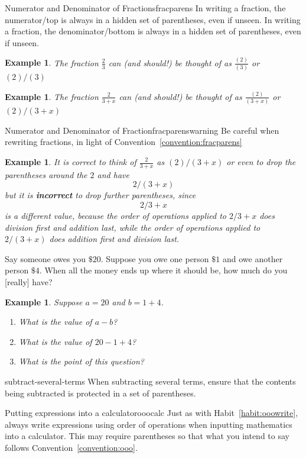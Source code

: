 \documentclass[twoside]{tufte-handout}
\date{\vspace{-0.5em}}
\newcounter{ekcounter}%
\theoremstyle{ekimcustom}
\newtheorem{exm}[ekcounter]{Example}
\begin{document}
\begin{bconvention}{Numerator and Denominator of Fractions}{fracparens}
In writing a fraction, the numerator/top is always in a hidden set of parentheses, even if unseen.
In writing a fraction, the denominator/bottom is always in a hidden set of parentheses, even if unseen.
\end{bconvention}
\begin{exm}
The fraction $\frac23$ can (and should!) be thought of as $\frac{(2)}{(3)}$ or $(2)/(3)$
\end{exm}
\begin{exm}
The fraction $\frac{2}{3+x}$ can (and should!) be thought of as $\frac{(2)}{(3+x)}$ or $(2)/(3+x)$
\end{exm}
\begin{bwarning}{Numerator and Denominator of Fraction}{fracparenswarning}
Be careful when rewriting fractions, in light of Convention~\ref{convention:fracparens}
\end{bwarning}
\begin{exm}
It is correct to think of $\frac{2}{3+x}$ as $(2)/(3+x)$ or even to drop the parentheses around the $2$ and have
\[ 2/(3+x)\]
but it is {\bf incorrect} to drop further parentheses, since
\[ 2/3+x \]
is a different value, because the order of operations applied to $2/3+x$ does division first and addition last, while the order of operations applied to $2/(3+x)$ does addition first and division last.
\end{exm}


Say someone owes you $\$20$. Suppose you owe one person $\$1$ and owe another person $\$4$. When all the money ends up where it should be, how much do you [really] have?
\begin{exm}
Suppose $a=20$ and $b=1+4$.
\begin{enumerate}
\item What is the value of $a-b$?
\vskip20pt
\item What is the value of $20-1+4$?
\vskip20pt
\item What is the point of this question?
\vskip20pt
\end{enumerate}
\end{exm}
\begin{bhabit}{}{subtract-several-terms}
When subtracting several terms, ensure that the contents being subtracted is protected in a set of parentheses.
\end{bhabit}


\begin{bhabit}{Putting expressions into a calculator}{ooocalc}
Just as with Habit~\ref{habit:ooowrite}, always write expressions using order of operations when inputting mathematics into a calculator. This may require parentheses so that what you intend to say follows Convention~\ref{convention:ooo}.
\end{bhabit}
\end{document}
